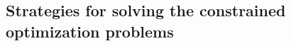 \documentclass[eprint]{actapoly}
\begin{document}
%		
%		
%		
%		
%		

\subsection{Strategies for solving the constrained optimization problems}
\end{document}
